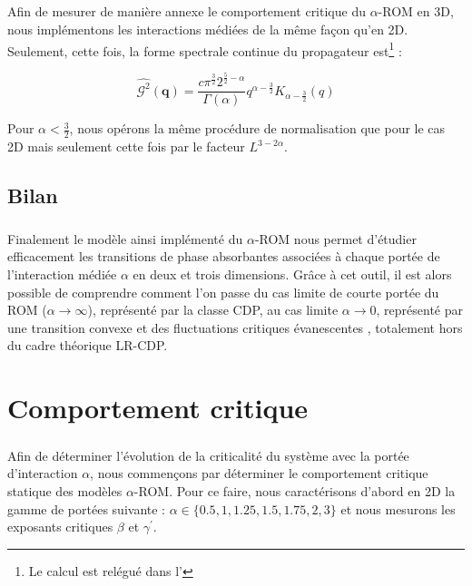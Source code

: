 \subparagraph{}Afin de mesurer de manière annexe le comportement critique du $\alpha$-ROM en 3D, nous implémentons les interactions médiées de la même façon qu'en 2D. Seulement, cette fois, la forme spectrale continue du propagateur est\footnote{Le calcul est relégué dans l'} :


\begin{equation}
	\hat{\mathcal{G}^2}(\mathbf{q}) = \frac{c\pi^\frac{3}{2}2^{\frac{5}{2}-\alpha}}{\Gamma (\alpha)}q^{\alpha-\frac{3}{2}}K_{\alpha-\frac{3}{2}}(q)
\end{equation}

\noindent Pour $\alpha < \frac{3}{2}$, nous opérons la même procédure de normalisation que pour le cas 2D mais seulement cette fois par le facteur $L^{3-2\alpha}$.

\subsection*{Bilan}

\subparagraph{}Finalement le modèle ainsi implémenté du $\alpha$-ROM nous permet d'étudier efficacement les transitions de phase absorbantes associées à chaque portée de l'interaction médiée $\alpha$ en deux et trois dimensions. Grâce à cet outil, il est alors possible de comprendre comment l'on passe du cas limite de courte portée du ROM ($\alpha\rightarrow\infty$), représenté par la classe CDP, au cas limite $\alpha \rightarrow 0$, représenté par une transition convexe et des fluctuations critiques évanescentes \cite{mari_absorbing_2022}, totalement hors du cadre théorique LR-CDP.

\section{Comportement critique}

\subparagraph{}Afin de déterminer l'évolution de la criticalité du système avec la portée d'interaction $\alpha$, nous commençons par déterminer le comportement critique statique des modèles $\alpha$-ROM. Pour ce faire, nous caractérisons d'abord en 2D la gamme de portées suivante : $\alpha \in \{ 0.5, 1, 1.25, 1.5, 1.75, 2, 3 \}$ et nous mesurons les exposants critiques $\beta$ et $\gamma^\prime$. 

